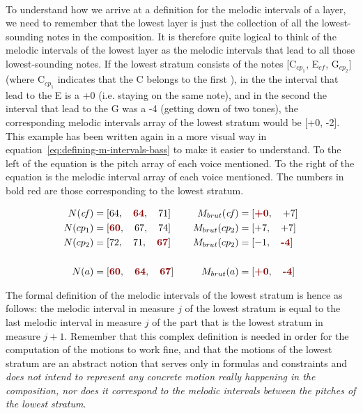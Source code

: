 \paragraph{}
To understand how we arrive at a definition for the melodic intervals of a layer, we need to remember that the lowest layer is just the collection of all the lowest-sounding notes in the composition. It is therefore quite logical to think of the melodic intervals of the lowest layer as the melodic intervals that lead to all those lowest-sounding notes. If the lowest stratum consists of the notes [C$_{cp_1}$, E$_{\mathit{cf}}$, G$_{cp_2}$] (where C$_{cp_1}$ indicates that the C belongs to the first \cp), in the \cfs the interval that lead to the E is a +0 (i.e. staying on the same note), and in the second \cps the interval that lead to the G was a -4 (getting down of two tones), the corresponding melodic intervals array of the lowest stratum would be [+0, -2]. This example has been written again in a more visual way in equation~\ref{eq:defining-m-intervals-bass} to make it easier to understand. To the left of the equation is the pitch array of each voice mentioned. To the right of the equation is the melodic interval array of each voice mentioned. The numbers in bold red are those corresponding to the lowest stratum.


\begin{equation}
    \begin{aligned}        
    N(\mathit{cf}) &= [64,\quad  \textcolor{darkred}{\textbf{64}},\quad  71] \quad 
    &M_{brut}(\mathit{cf}) &= [\textcolor{darkred}{\textbf{+0}}, \quad +7]\\
    N(cp_1) &= [\textcolor{darkred}{\textbf{60}},\quad  67,\quad  74] \quad 
    &M_{brut}(cp_2) &= [+7, \quad +7]\\
    N(cp_2) &= [72,\quad  71,\quad  \textcolor{darkred}{\textbf{67}}] \quad 
    &M_{brut}(cp_2) &= [-1, \quad \textcolor{darkred}{\textbf{-4}}]\\
    \\
    N(a) &= [\textcolor{darkred}{\textbf{60}},\quad  \textcolor{darkred}{\textbf{64}},\quad  \textcolor{darkred}{\textbf{67}}] \quad 
    &M_{brut}(a) &= [\textcolor{darkred}{\textbf{+0}}, \quad \textcolor{darkred}{\textbf{-4}}]\\
\end{aligned}
\label{eq:defining-m-intervals-bass}
\end{equation}


The formal definition of the melodic intervals of the lowest stratum is hence as follows: the melodic interval in measure $j$ of the lowest stratum is equal to the last melodic interval in measure $j$ of the part that is the lowest stratum in measure $j+1$. Remember that this complex definition is needed in order for the computation of the motions to work fine, and that the motions of the lowest stratum are an abstract notion that serves only in formulas and constraints and \textit{does not intend to represent any concrete motion really happening in the composition, nor does it correspond to the melodic intervals between the pitches of the lowest stratum}.

